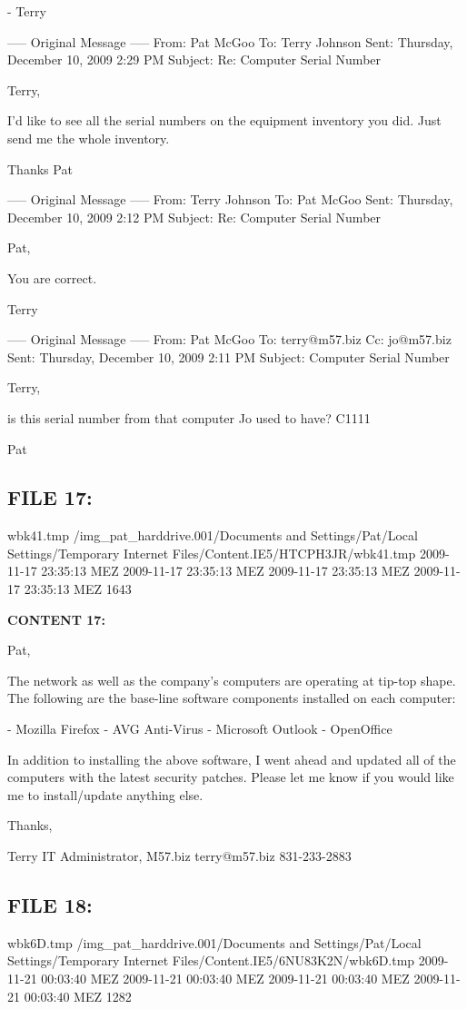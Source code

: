 - Terry

----- Original Message -----
From: Pat McGoo
To: Terry Johnson
Sent: Thursday, December 10, 2009 2:29 PM
Subject: Re: Computer Serial Number

Terry,

I'd like to see all the serial numbers on the equipment inventory you
did.  Just send me the whole inventory.

Thanks
Pat

----- Original Message -----
From: Terry Johnson
To: Pat McGoo
Sent: Thursday, December 10, 2009 2:12 PM
Subject: Re: Computer Serial Number

Pat,

You are correct.

Terry

----- Original Message -----
From: Pat McGoo
To: terry@m57.biz
Cc: jo@m57.biz
Sent: Thursday, December 10, 2009 2:11 PM
Subject: Computer Serial Number

Terry,

is this serial number from that computer Jo used to have?  C1111

Pat


\subsection{FILE 17:}
wbk41.tmp	/img_pat_harddrive.001/Documents and Settings/Pat/Local Settings/Temporary Internet Files/Content.IE5/HTCPH3JR/wbk41.tmp		2009-11-17 23:35:13 MEZ	2009-11-17 23:35:13 MEZ	2009-11-17 23:35:13 MEZ	2009-11-17 23:35:13 MEZ	1643	

\textbf{CONTENT 17:}

Pat,

The network as well as the company's computers are operating at tip-top 
shape.  The following are the base-line software components installed on 
each computer:

- Mozilla Firefox
- AVG Anti-Virus
- Microsoft Outlook
- OpenOffice

In addition to installing the above software, I went ahead and updated all 
of the computers with the latest security patches.  Please let me know if 
you would like me to install/update anything else.

Thanks,

Terry
IT Administrator, M57.biz
terry@m57.biz
831-233-2883


\subsection{FILE 18:}
wbk6D.tmp	/img_pat_harddrive.001/Documents and Settings/Pat/Local Settings/Temporary Internet Files/Content.IE5/6NU83K2N/wbk6D.tmp		2009-11-21 00:03:40 MEZ	2009-11-21 00:03:40 MEZ	2009-11-21 00:03:40 MEZ	2009-11-21 00:03:40 MEZ	1282	

